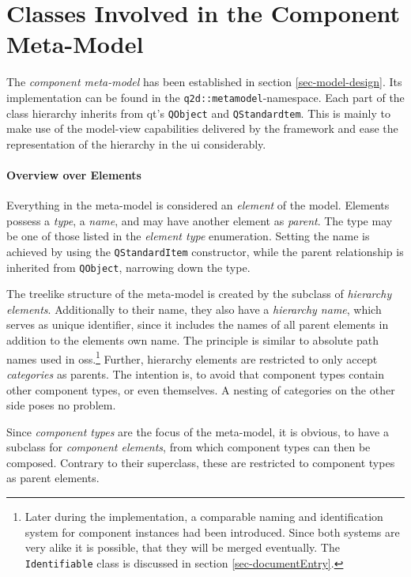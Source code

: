 \section{Classes Involved in the Component Meta-Model}
	\label{sec-metamodel}
	The \emph{component meta-model} has been established in section \ref{sec-model-design}.
	Its implementation can be found in the \texttt{q2d::metamodel}-namespace.
	Each part of the class hierarchy inherits from \gls{qt}'s \texttt{QObject} and \texttt{QStandardtem}.
	This is mainly to make use of the model-view capabilities delivered by the framework and ease the representation of the hierarchy in the \gls{ui} considerably.

	\paragraph{Overview over Elements}
	Everything in the meta-model is considered an \emph{element} of the model.
	Elements possess a \emph{type}, a \emph{name}, and may have another element as \emph{parent}.
	The type may be one of those listed in the \emph{element type} enumeration.
	Setting the name is achieved by using the \texttt{QStandardItem} constructor, while the parent relationship is inherited from \texttt{QObject}, narrowing down the type.
	
	The treelike structure of the meta-model is created by the subclass of \emph{hierarchy elements}.
	Additionally to their name, they also have a \emph{hierarchy name}, which serves as unique identifier, since it includes the names of all parent elements in addition to the elements own name.
	The principle is similar to absolute path names used in \glspl{os}.\footnote{
		Later during the implementation, a comparable naming and identification system for component instances had been introduced.
		Since both systems are very alike it is possible, that they will be merged eventually.
		The \texttt{Identifiable} class is discussed in section \ref{sec-documentEntry}.
	}
	Further, hierarchy elements are restricted to only accept \emph{categories} as parents.
	The intention is, to avoid that component types contain other component types, or even themselves.
	A nesting of categories on the other side poses no problem.
	
	Since \emph{component types} are the focus of the meta-model, it is obvious, to have a subclass for \emph{component elements}, from which component types can then be composed.
	Contrary to their superclass, these are restricted to component types as parent elements. 
	
